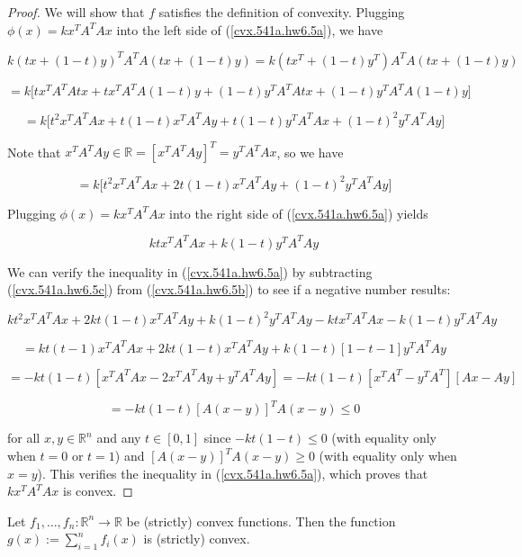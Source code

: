 \begin{proof}

We will show that \(f\) satisfies the definition of convexity. Plugging \( \phi(x) = k x^TA^TAx\) into the left side of (\ref{cvx.541a.hw6.5a}), we have

\[
k(tx+(1-t)y)^T A^TA(tx+(1-t)y)  = k(tx^T+(1-t)y^T) A^TA(tx+(1-t)y) 
\]

\[
= k \big[ tx^T A^TA tx + tx^T A^TA  (1-t)y +   (1-t)y^T A^TAtx + (1-t)y^T A^TA(1-t)y  \big]
\]

\[
= k \big[ t^2x^T A^TA x + t(1-t)x^T A^TA  y +   t(1-t)y^T A^TAx + (1-t)^2y^T A^TAy  \big]
\]

Note that \(x^T A^TA  y \in \mathbb{R} = [x^T A^TA  y ]^T = y^T A^TAx\), so we have

\begin{equation}\label{cvx.541a.hw6.5b}
= k \big[ t^2x^T A^TA x + 2t(1-t)x^T A^TA  y  + (1-t)^2y^T A^TAy  \big]
\end{equation}

Plugging \( \phi(x) = k x^TA^TAx\) into the right side of (\ref{cvx.541a.hw6.5a}) yields

\begin{equation}\label{cvx.541a.hw6.5c}
 k t  x^TA^TAx +k(1-t)  y^TA^TAy
\end{equation}

We can verify the inequality in (\ref{cvx.541a.hw6.5a}) by subtracting (\ref{cvx.541a.hw6.5c}) from (\ref{cvx.541a.hw6.5b}) to see if a negative number results:

\[
 k  t^2x^T A^TA x +2k t(1-t)x^T A^TA  y  + k  (1-t)^2y^T A^TAy -k  t  x^TA^TAx - k (1-t) y^TA^TAy
\]

\[
= k t (t - 1) x^T A^TA x   +2k t(1-t)x^T A^TA  y  + k (1-t) [1-t - 1] y^T A^TAy
\]

\[
= -k t (1 - t) [x^T A^TA x - 2x^T A^TA  y +  y^T A^TAy]  = -k t (1 - t) [x^T A^T - y^T A^T ] [Ax - Ay ]
\]

\[
  = -k t (1 - t) [A(x-y) ]^T A(x-y)  \leq 0
\]

for all \(x, y \in \mathbb{R}^n\) and any \(t \in [0,1]\) since \( -k t (1 - t)  \leq 0\) (with equality only when \(t = 0\) or \(t= 1\)) and \( [A(x-y) ]^T A(x-y)  \geq 0\) (with equality only when \(x= y\)). This verifies the inequality in (\ref{cvx.541a.hw6.5a}), which proves that \( k x^TA^TAx\) is convex.

\end{proof}

\begin{proposition}\label{cvx.sum.cvx.cvx} Let \(f_1, \ldots, f_n: \mathbb{R}^n \to \mathbb{R}\) be (strictly) convex functions. Then the function \(g(x) := \sum_{i=1}^n f_i(x)\) is (strictly) convex.

\end{proposition}

